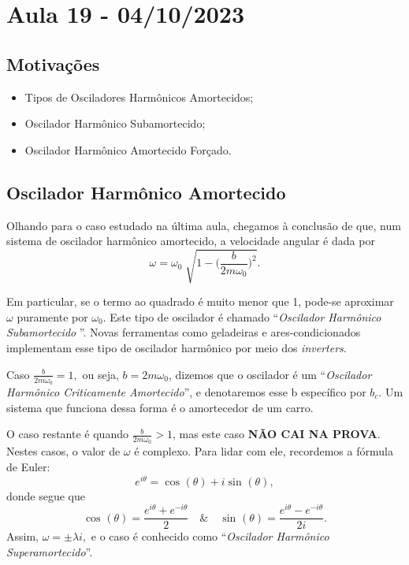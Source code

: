 \documentclass[physicsII_notes.tex]{subfiles}
\begin{document}
\section{Aula 19 - 04/10/2023}
\subsection{Motivações}
\begin{itemize}
	\item Tipos de Osciladores Harmônicos Amortecidos;
	\item Oscilador Harmônico Subamortecido;
	\item Oscilador Harmônico Amortecido Forçado.
\end{itemize}
\subsection{Oscilador Harmônico Amortecido}
Olhando para o caso estudado na última aula, chegamos à conclusão de que, num sistema
de oscilador harmônico amortecido, a velocidade angular é dada por
\[
	\omega  = \omega_{0} \sqrt[]{1-\biggl(\frac{b}{2m\omega_{0}}\biggr)^{2}}.
\]

Em particular, se o termo ao quadrado é muito menor que 1, pode-se aproximar \(\omega \) puramente
por \(\omega_{0}\). Este tipo de oscilador é chamado ``\textit{Oscilador Harmônico Subamortecido} ''.
Novas ferramentas como geladeiras e ares-condicionados implementam esse tipo de oscilador harmônico por meio
dos \textit{inverters}.

Caso \(\frac{b}{2m\omega_{0}} = 1,\) ou seja, \(b = 2m\omega_{0}\), dizemos que o oscilador é um
``\textit{Oscilador Harmônico Criticamente Amortecido}'', e denotaremos esse b específico por \(b_{c}.\)
Um sistema que funciona dessa forma é o amortecedor de um carro.

O caso restante é quando \(\frac{b}{2m\omega_{0}} > 1\), mas este caso \textbf{NÃO CAI NA PROVA}. Nestes casos,
o valor de \(\omega \) é complexo. Para lidar com ele, recordemos a fórmula de Euler:
\[
	e^{i \theta } = \cos^{}{(\theta )} + i\sin^{}{(\theta )},
\]
donde segue que
\[
	\cos^{}{(\theta )} = \frac{e^{i\theta }+e^{-i\theta }}{2}\quad\&\quad \sin^{}{(\theta )} = \frac{e^{i\theta }-e^{-i\theta }}{2i}.
\]
Assim, \(\omega = \pm \lambda i,\) e o caso é conhecido como ``\textit{Oscilador Harmônico Superamortecido}''.
\end{document}
